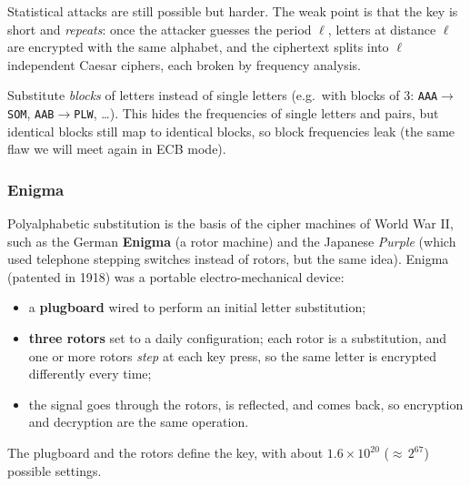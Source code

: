 Statistical attacks are still possible but harder. The weak point is that the key is short and \emph{repeats}: once the attacker guesses the period $\ell$, letters at distance $\ell$ are encrypted with the same alphabet, and the ciphertext splits into $\ell$ independent Caesar ciphers, each broken by frequency analysis.

\begin{definition}
Substitute \emph{blocks} of letters instead of single letters (e.g.\ with blocks of 3: \texttt{AAA}$\to$\texttt{SOM}, \texttt{AAB}$\to$\texttt{PLW}, \dots). This hides the frequencies of single letters and pairs, but identical blocks still map to identical blocks, so block frequencies leak (the same flaw we will meet again in ECB mode).
\end{definition}

\subsubsection{Enigma}

Polyalphabetic substitution is the basis of the cipher machines of World War II, such as the German \textbf{Enigma} (a rotor machine) and the Japanese \emph{Purple} (which used telephone stepping switches instead of rotors, but the same idea). Enigma (patented in 1918) was a portable electro-mechanical device:
\begin{itemize}
    \item a \textbf{plugboard} wired to perform an initial letter substitution;
    \item \textbf{three rotors} set to a daily configuration; each rotor is a substitution, and one or more rotors \emph{step} at each key press, so the same letter is encrypted differently every time;
    \item the signal goes through the rotors, is reflected, and comes back, so encryption and decryption are the same operation.
\end{itemize}
The plugboard and the rotors define the key, with about $1.6 \times 10^{20}$ (${\approx}\,2^{67}$) possible settings.

